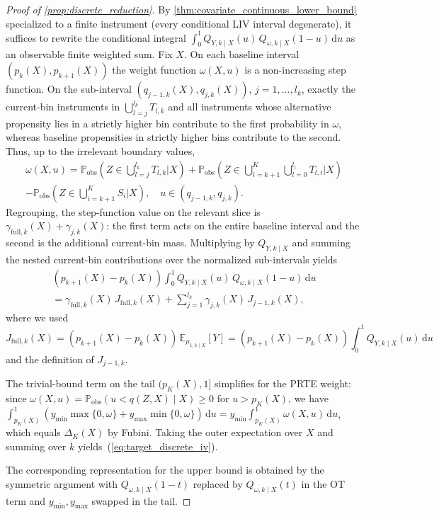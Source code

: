 \begin{proof}[Proof of \cref{prop:discrete_reduction}]
    By \cref{thm:covariate_continuous_lower_bound} specialized to a finite instrument (every conditional LIV interval degenerate), it suffices to rewrite the conditional integral $\int_0^1 Q_{Y,k\mid X}(u)\,Q_{\omega,k\mid X}(1-u)\,\mathrm{d}u$ as an observable finite weighted sum. Fix $X$. On each baseline interval $(p_k(X), p_{k+1}(X))$ the weight function $\omega(X,u)$ is a non-increasing step function. On the sub-interval $(q_{j-1,k}(X),q_{j,k}(X))$, $j=1,\ldots,l_k$, exactly the current-bin instruments in $\bigcup_{l=j}^{l_k}T_{l,k}$ and all instruments whose alternative propensity lies in a strictly higher bin contribute to the first probability in $\omega$, whereas baseline propensities in strictly higher bins contribute to the second. Thus, up to the irrelevant boundary values,
    \begin{multline*}
        \omega(X,u) = \mathbb{P}_{\text{obs}}\!\left(Z \in \bigcup_{l=j}^{l_k} T_{l,k} \mathrel{\big|} X\right) + \mathbb{P}_{\text{obs}}\!\left(Z \in \bigcup_{i=k+1}^K \bigcup_{l=0}^{l_i} T_{l,i} \mathrel{\big|} X\right) \\
        - \mathbb{P}_{\text{obs}}\!\left(Z \in \bigcup_{i=k+1}^K S_i \mathrel{\big|} X\right),\quad u\in(q_{j-1,k},q_{j,k}).
    \end{multline*}
    Regrouping, the step-function value on the relevant slice is $\gamma_{\text{full},k}(X)+\gamma_{j,k}(X)$: the first term acts on the entire baseline interval and the second is the additional current-bin mass. Multiplying by $Q_{Y,k\mid X}$ and summing the nested current-bin contributions over the normalized sub-intervals yields
    \begin{multline*}
        (p_{k+1}(X) - p_k(X)) \int_0^1 Q_{Y,k\mid X}(u)\,Q_{\omega,k\mid X}(1-u)\,\mathrm{d}u \\
        = \gamma_{\text{full},k}(X)\, J_{\text{full},k}(X) + \sum_{j=1}^{l_k}\gamma_{j,k}(X)\, J_{j-1,k}(X),
    \end{multline*}
    where we used
    \begin{equation*}
        J_{\text{full},k}(X) = (p_{k+1}(X)-p_k(X))\,\mathbb{E}_{\mu_{1,k\mid X}}[Y] = (p_{k+1}(X)-p_k(X))\int_0^1 Q_{Y,k\mid X}(u)\,\mathrm{d}u
    \end{equation*}
    and the definition of $J_{j-1,k}$.

    The trivial-bound term on the tail $(p_K(X), 1]$ simplifies for the PRTE weight: since $\omega(X,u) = \mathbb{P}_{\text{obs}}(u < q(Z,X) \mid X) \geqslant 0$ for $u > p_K(X)$, we have $\int_{p_K(X)}^1 (y_{\min}\max\{0,\omega\} + y_{\max}\min\{0,\omega\})\,\mathrm{d}u = y_{\min}\int_{p_K(X)}^1 \omega(X,u)\,\mathrm{d}u$, which equals $\Delta_K(X)$ by Fubini. Taking the outer expectation over $X$ and summing over $k$ yields~(\ref{eq:target_discrete_iv}).

    The corresponding representation for the upper bound is obtained by the symmetric argument with $Q_{\omega,k\mid X}(1-t)$ replaced by $Q_{\omega,k\mid X}(t)$ in the OT term and $y_{\min}, y_{\max}$ swapped in the tail.
\end{proof}

